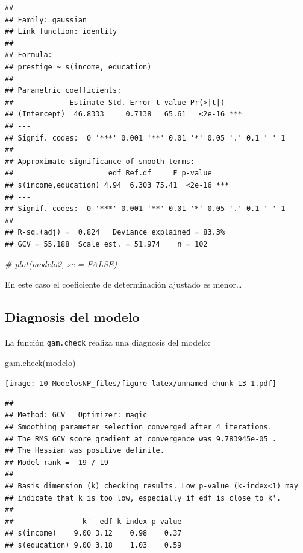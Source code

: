 \documentclass[
]{book}
\newenvironment{Shaded}{\begin{snugshade}}{\end{snugshade}}
\newcommand{\CommentTok}[1]{\textcolor[rgb]{0.56,0.35,0.01}{\textit{#1}}}
\newcommand{\FunctionTok}[1]{\textcolor[rgb]{0.00,0.00,0.00}{#1}}
\newcommand{\NormalTok}[1]{#1}
\theoremstyle{break}
\theoremstyle{nonumberplain}
\begin{document}
\begin{verbatim}
## 
## Family: gaussian 
## Link function: identity 
## 
## Formula:
## prestige ~ s(income, education)
## 
## Parametric coefficients:
##             Estimate Std. Error t value Pr(>|t|)    
## (Intercept)  46.8333     0.7138   65.61   <2e-16 ***
## ---
## Signif. codes:  0 '***' 0.001 '**' 0.01 '*' 0.05 '.' 0.1 ' ' 1
## 
## Approximate significance of smooth terms:
##                      edf Ref.df     F p-value    
## s(income,education) 4.94  6.303 75.41  <2e-16 ***
## ---
## Signif. codes:  0 '***' 0.001 '**' 0.01 '*' 0.05 '.' 0.1 ' ' 1
## 
## R-sq.(adj) =  0.824   Deviance explained = 83.3%
## GCV = 55.188  Scale est. = 51.974    n = 102
\end{verbatim}

\begin{Shaded}
\begin{Highlighting}[]
\CommentTok{\# plot(modelo2, se = FALSE)}
\end{Highlighting}
\end{Shaded}

En este caso el coeficiente de determinación ajustado es menor\ldots{}

\hypertarget{diagnosis-del-modelo-2}{%
\subsection{Diagnosis del modelo}\label{diagnosis-del-modelo-2}}

La función \texttt{gam.check} realiza una diagnosis del modelo:

\begin{Shaded}
\begin{Highlighting}[]
\FunctionTok{gam.check}\NormalTok{(modelo)}
\end{Highlighting}
\end{Shaded}

\texttt{[image: 10-ModelosNP\_files/figure-latex/unnamed-chunk-13-1.pdf]}

\begin{verbatim}
## 
## Method: GCV   Optimizer: magic
## Smoothing parameter selection converged after 4 iterations.
## The RMS GCV score gradient at convergence was 9.783945e-05 .
## The Hessian was positive definite.
## Model rank =  19 / 19 
## 
## Basis dimension (k) checking results. Low p-value (k-index<1) may
## indicate that k is too low, especially if edf is close to k'.
## 
##                k'  edf k-index p-value
## s(income)    9.00 3.12    0.98    0.37
## s(education) 9.00 3.18    1.03    0.59
\end{verbatim}
\end{document}
